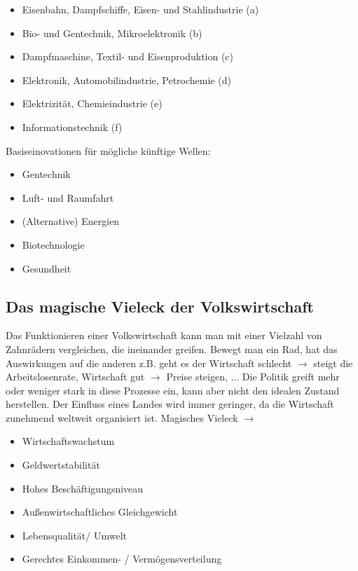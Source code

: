 \documentclass[a4paper]{report}
\begin{document}
\begin{itemize}
\item Eisenbahn, Dampfschiffe, Eisen- und Stahlindustrie (a)
\item Bio- und Gentechnik, Mikroelektronik (b)
\item Dampfmaschine, Textil- und Eisenproduktion (c)
\item Elektronik, Automobilindustrie, Petrochemie (d)
\item Elektrizität, Chemieindustrie (e)
\item Informationstechnik (f)
\end{itemize}

Basiseinovationen für mögliche künftige Wellen:

\begin{itemize}
\item Gentechnik
\item Luft- und Raumfahrt
\item (Alternative) Energien
\item Biotechnologie
\item Gesundheit
\end{itemize}

\subsection*{Das magische Vieleck der Volkswirtschaft}

Das Funktionieren einer Volkswirtschaft kann man mit einer Vielzahl von Zahnrädern vergleichen, die ineinander greifen. Bewegt man ein Rad, hat das Auswirkungen auf die anderen z.B. geht es der Wirtschaft schlecht $\rightarrow$ steigt die Arbeitslosenrate, Wirtschaft gut $\rightarrow$ Preise steigen, ...
\newline
\newline
Die Politik greift mehr oder weniger stark in diese Prozesse ein, kann aber nicht den idealen Zustand herstellen. Der Einfluss eines Landes wird immer geringer, da die Wirtschaft zunehmend weltweit organisiert ist.
\newline
\newline
Magisches Vieleck $\rightarrow$

\begin{itemize}
\item Wirtschaftswachstum
\item Geldwertstabilität
\item Hohes Beschäftigungsniveau
\item Außenwirtschaftliches Gleichgewicht
\item Lebensqualität/ Umwelt
\item Gerechtes Einkommen- / Vermögensverteilung
\end{itemize}
\end{document}
